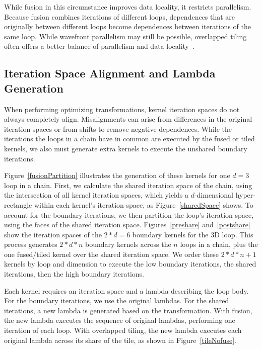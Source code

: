 While fusion in this circumstance improves data locality, it restricts
parallelism.
Because fusion combines iterations of different loops, dependences that
are originally between different loops become dependences between iterations
of the same loop. 
While wavefront parallelism may still be possible, overlapped tiling often
offers a better balance of parallelism and data locality~\cite{CathieSC14}.

\subsection{Iteration Space Alignment and Lambda Generation}

When performing optimizing transformations, kernel iteration spaces do not
always completely align. 
Misalignments can arise from differences in the original iteration spaces
or from shifts to remove negative dependences. 
While the iterations the loops in a chain have in common are executed by
the fused or tiled kernels, we also must generate extra kernels to execute
the unshared boundary iterations.

Figure~\ref{fusionPartition} illustrates the generation of these kernels
for one $d=3$ loop in a chain. 
First, we calculate the shared iteration space of the chain, using the
intersection of all kernel iteration spaces, which yields a $d$-dimensional
hyper-rectangle within each kernel's iteration space, as
Figure~\ref{sharedSpace} shows.
To account for the boundary iterations, we then partition the loop's
iteration space, using the faces of the shared iteration space.
Figures~\ref{preshare} and~\ref{postshare} show the iteration spaces of the
$2*d=6$ boundary kernels for the 3D loop. 
This process generates $2*d*n$ boundary kernels across the $n$ loops in a
chain, plus the one fused/tiled kernel over the shared iteration space. 
We order these $2*d*n+1$ kernels by loop and dimension to execute the low
boundary iterations, the shared iterations, then the high boundary iterations.

Each kernel requires an iteration space and a lambda describing the loop body. 
For the boundary iterations, we use the original lambdas. 
For the shared iterations, a new lambda is generated based on the transformation. 
With fusion, the new lambda executes the sequence of original lambdas, performing one iteration of each loop.
With overlapped tiling, the new lambda executes each original lambda across its share of the tile, as shown in Figure~\ref{tileNofuse}.

